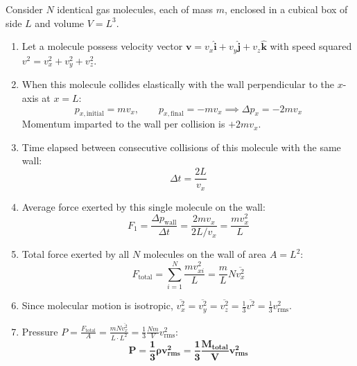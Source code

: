 \documentclass[10pt,a4paper]{article}
\begin{document}
\begin{formulabox}[First-Principles Derivation of Ideal Gas Pressure: $P = \frac{1}{3}\rho v_{\text{rms}}^2$]
Consider $N$ identical gas molecules, each of mass $m$, enclosed in a cubical box of side $L$ and volume $V = L^3$.
\begin{enumerate}
  \item Let a molecule possess velocity vector $\mathbf{v} = v_x \hat{\mathbf{i}} + v_y \hat{\mathbf{j}} + v_z \hat{\mathbf{k}}$ with speed squared $v^2 = v_x^2 + v_y^2 + v_z^2$.
  \item When this molecule collides elastically with the wall perpendicular to the $x$-axis at $x = L$:
  \begin{equation}
    p_{x,\text{initial}} = m v_x, \qquad p_{x,\text{final}} = -m v_x \implies \Delta p_x = -2 m v_x
  \end{equation}
  Momentum imparted to the wall per collision is $+2 m v_x$.
  \item Time elapsed between consecutive collisions of this molecule with the same wall:
  \begin{equation}
    \Delta t = \frac{2 L}{v_x}
  \end{equation}
  \item Average force exerted by this single molecule on the wall:
  \begin{equation}
    F_1 = \frac{\Delta p_{\text{wall}}}{\Delta t} = \frac{2 m v_x}{2 L / v_x} = \frac{m v_x^2}{L}
  \end{equation}
  \item Total force exerted by all $N$ molecules on the wall of area $A = L^2$:
  \begin{equation}
    F_{\text{total}} = \sum_{i=1}^N \frac{m v_{xi}^2}{L} = \frac{m}{L} N \overline{v_x^2}
  \end{equation}
  \item Since molecular motion is isotropic, $\overline{v_x^2} = \overline{v_y^2} = \overline{v_z^2} = \frac{1}{3}\overline{v^2} = \frac{1}{3} v_{\text{rms}}^2$.
  \item Pressure $P = \frac{F_{\text{total}}}{A} = \frac{m N \overline{v_x^2}}{L \cdot L^2} = \frac{1}{3}\frac{N m}{V} v_{\text{rms}}^2$:
  \begin{equation}
    \mathbf{P = \frac{1}{3}\rho v_{\text{rms}}^2 = \frac{1}{3}\frac{M_{\text{total}}}{V} v_{\text{rms}}^2}
  \end{equation}
\end{enumerate}
\end{formulabox}
\end{document}
